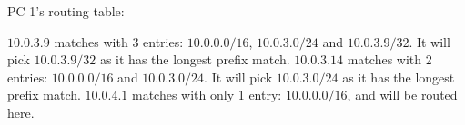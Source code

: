 PC 1's routing table:

$10.0.3.9$ matches with 3 entries: $10.0.0.0 / 16$, $10.0.3.0 / 24$ and $10.0.3.9 / 32$. It will pick $10.0.3.9 / 32$ as it has the longest prefix match.
$10.0.3.14$ matches with 2 entries: $10.0.0.0 / 16$ and $10.0.3.0 / 24$. It will pick $10.0.3.0 / 24$ as it has the longest prefix match.
$10.0.4.1$ matches with only 1 entry: $10.0.0.0 / 16$, and will be routed here.